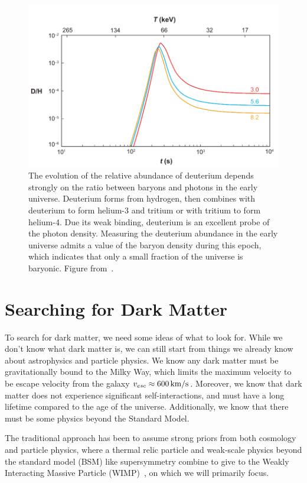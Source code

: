 \begin{figure}[htbp]
\centering
    \includegraphics[width=\textwidth]{figures/dm/bbn_eta}
    \caption{The evolution of the relative abundance of deuterium depends strongly on the ratio between baryons and photons in the early universe. Deuterium forms from hydrogen, then combines with deuterium to form helium-3 and tritium or with tritium to form helium-4. Due its weak binding, deuterium is an excellent probe of the photon density. Measuring the deuterium abundance in the early universe admits a value of the baryon density during this epoch, which indicates that only a small fraction of the universe is baryonic. Figure from~\cite{Steigman:2007xt}.}\label{fig:bbn}
\end{figure}

\section{Searching for Dark Matter}

To search for dark matter, we need some ideas of what to look for. While we don't know what dark matter is, we can still start from things we already know about astrophysics and particle physics. We know any dark matter must be gravitationally bound to the Milky Way, which limits the maximum velocity to be escape velocity from the galaxy $v_{esc} \approx 600\,\mathrm{km/s}$. Moreover, we know that dark matter does not experience significant self-interactions, and must have a long lifetime compared to the age of the universe. Additionally, we know that there must be some physics beyond the Standard Model.

The traditional approach has been to assume strong priors from both cosmology and particle physics, where a thermal relic particle and weak-scale physics beyond the standard model (BSM) like supersymmetry combine to give to the Weakly Interacting Massive Particle (WIMP)~\cite{Jungman:1995df}, on which we will primarily focus.

